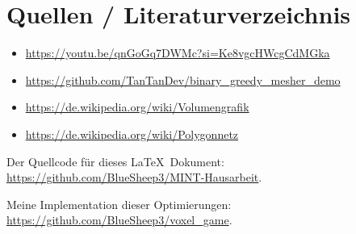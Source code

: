 \section{Quellen / Literaturverzeichnis}

\begin{itemize}
	\item \url{https://youtu.be/qnGoGq7DWMc?si=Ke8vgcHWcgCdMGka}
	\item \url{https://github.com/TanTanDev/binary_greedy_mesher_demo}

	\item \url{https://de.wikipedia.org/wiki/Volumengrafik}
	\item \url{https://de.wikipedia.org/wiki/Polygonnetz}
\end{itemize}

\setlength{\parindent}{0pt}

Der Quellcode für dieses \LaTeX\ Dokument: \\
\url{https://github.com/BlueSheep3/MINT-Hausarbeit}.

\vspace{0.2cm}

Meine Implementation dieser Optimierungen: \\
\url{https://github.com/BlueSheep3/voxel_game}.
